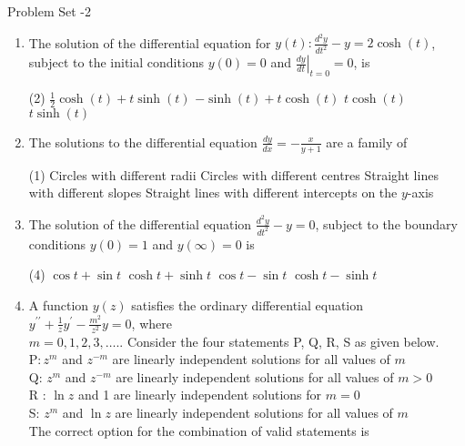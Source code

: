 \newpage
\begin{abox}
	Problem Set -2
\end{abox}
\begin{enumerate}[label=\color{ocre}\textbf{\arabic*.}]
	\item  The solution of the differential equation for $y(t): \frac{d^{2} y}{d t^{2}}-y=2 \cosh (t)$, subject to the initial conditions $y(0)=0$ and $\left.\frac{d y}{d t}\right|_{t=0}=0$, is
	{}
	\begin{tasks}(2)
		\task[\textbf{A.}] $\frac{1}{2} \cosh (t)+t \sinh (t)$
		\task[\textbf{B.}] $-\sinh (t)+t \cosh (t)$
		\task[\textbf{C.}] $t \cosh (t)$
		\task[\textbf{D.}] $t \sinh (t)$
	\end{tasks}
	\item The solutions to the differential equation $\frac{d y}{d x}=-\frac{x}{y+1}$ are a family of
	{}
	\begin{tasks}(1)
		\task[\textbf{A.}] Circles with different radii
		\task[\textbf{B.}] Circles with different centres
		\task[\textbf{C.}]  Straight lines with different slopes
		\task[\textbf{D.}]  Straight lines with different intercepts on the $y$-axis
	\end{tasks}
	\item The solution of the differential equation $\frac{d^{2} y}{d t^{2}}-y=0$, subject to the boundary conditions $y(0)=1$ and $y(\infty)=0$ is
	{}
	\begin{tasks}(4)
		\task[\textbf{A.}] $\cos t+\sin t$
		\task[\textbf{B.}] $\cosh t+\sinh t$
		\task[\textbf{C.}] $\cos t-\sin t$
		\task[\textbf{D.}]  $\cosh t-\sinh t$
	\end{tasks}
	\item  A function $y(z)$ satisfies the ordinary differential equation $y^{\prime \prime}+\frac{1}{z} y^{\prime}-\frac{m^{2}}{z^{2}} y=0$, where\\
	$m=0,1,2,3, \ldots . .$ Consider the four statements P, Q, R, S as given below.\\
	$\mathrm{P}: z^{m}$ and $z^{-m}$ are linearly independent solutions for all values of $m$\\
	Q: $z^{m}$ and $z^{-m}$ are linearly independent solutions for all values of $m>0$\\
	$\mathrm{R}$ : $\ln z$ and 1 are linearly independent solutions for $m=0$\\
	S: $z^{m}$ and $\ln z$ are linearly independent solutions for all values of $m$\\
	The correct option for the combination of valid statements is

\end{enumerate}
